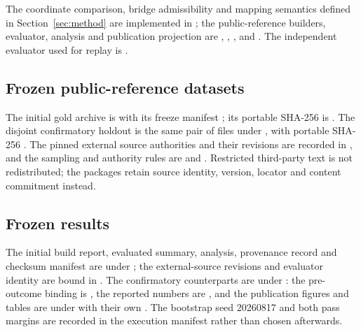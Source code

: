 The coordinate comparison, bridge admissibility and mapping semantics defined
in Section~\ref{sec:method} are implemented in
; the public-reference builders,
evaluator, analysis and publication projection are
,
,
,
 and
. The independent
evaluator used for replay is
.

\subsection{Frozen public-reference datasets}

The initial gold archive is
 with
its freeze manifest
;
its portable SHA-256 is
. The
disjoint confirmatory holdout is the same pair of files under
, with portable
SHA-256
. The
pinned external source authorities and their revisions are recorded in
, and the sampling and
authority rules are  and
. Restricted third-party text is not
redistributed; the packages retain source identity, version, locator and
content commitment instead.

\subsection{Frozen results}

The initial build report, evaluated summary, analysis, provenance record and
checksum manifest are under ; the
external-source revisions and evaluator identity are bound in
. The confirmatory
counterparts are under : the
pre-outcome binding is , the reported numbers are
, and the publication figures and tables are
under  with their own . The bootstrap seed
20260817 and both pass margins are recorded in the execution manifest rather
than chosen afterwards.

